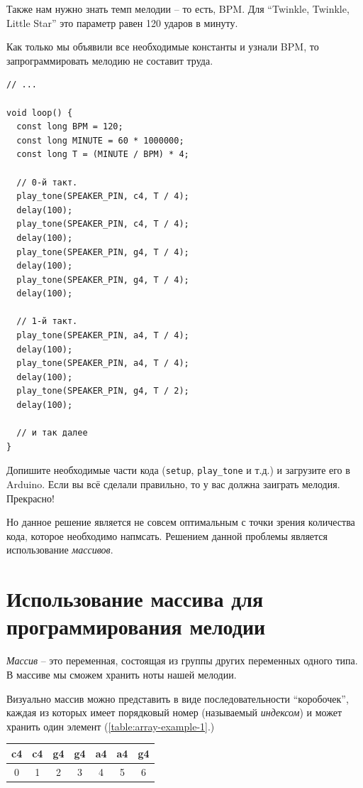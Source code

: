 \documentclass[a4paper,twoside]{book}
\newcounter{example-counter}
\begin{document}
Также нам нужно знать темп мелодии -- то есть, BPM. Для ``Twinkle, Twinkle,
Little Star'' это параметр равен 120 ударов в минуту.

Как только мы объявили все необходимые константы и узнали BPM, то
запрограммировать мелодию не составит труда.

\begin{verbatim}
// ...

void loop() {
  const long BPM = 120;
  const long MINUTE = 60 * 1000000;
  const long T = (MINUTE / BPM) * 4;

  // 0-й такт.
  play_tone(SPEAKER_PIN, c4, T / 4);
  delay(100);
  play_tone(SPEAKER_PIN, c4, T / 4);
  delay(100);
  play_tone(SPEAKER_PIN, g4, T / 4);
  delay(100);
  play_tone(SPEAKER_PIN, g4, T / 4);
  delay(100);

  // 1-й такт.
  play_tone(SPEAKER_PIN, a4, T / 4);
  delay(100);
  play_tone(SPEAKER_PIN, a4, T / 4);
  delay(100);
  play_tone(SPEAKER_PIN, g4, T / 2);
  delay(100);

  // и так далее
}
\end{verbatim}

Допишите необходимые части кода (\texttt{setup}, \texttt{play\_tone} и т.д.) и
загрузите его в Arduino. Если вы всё сделали правильно, то у вас должна заиграть
мелодия. Прекрасно!

Но данное решение является не совсем оптимальным с точки зрения количества кода,
которое необходимо напмсать. Решением данной проблемы является использование
\emph{массивов}.

\section{Использование массива для программирования мелодии}

\emph{Массив} -- это переменная, состоящая из группы других переменных одного
типа. В массиве мы сможем хранить ноты нашей мелодии.

Визуально массив можно представить в виде последовательности ``коробочек'',
каждая из которых имеет порядковый номер (называемый \emph{индексом}) и может
хранить один элемент (\ref{table:array-example-1}.)

\begin{tabular}{|p{1cm}|p{1cm}|p{1cm}|p{1cm}|p{1cm}|p{1cm}|p{1cm}|}
  \hline
  c4 & c4 & g4 & g4 & a4 & a4 & g4 \\
  \hline
  \multicolumn{1}{c}{0}
  & \multicolumn{1}{c}{1}
  & \multicolumn{1}{c}{2}
  & \multicolumn{1}{c}{3}
  & \multicolumn{1}{c}{4}
  & \multicolumn{1}{c}{5}
  & \multicolumn{1}{c}{6}
  \label{table:array-example-1}
\end{tabular}
\end{document}
